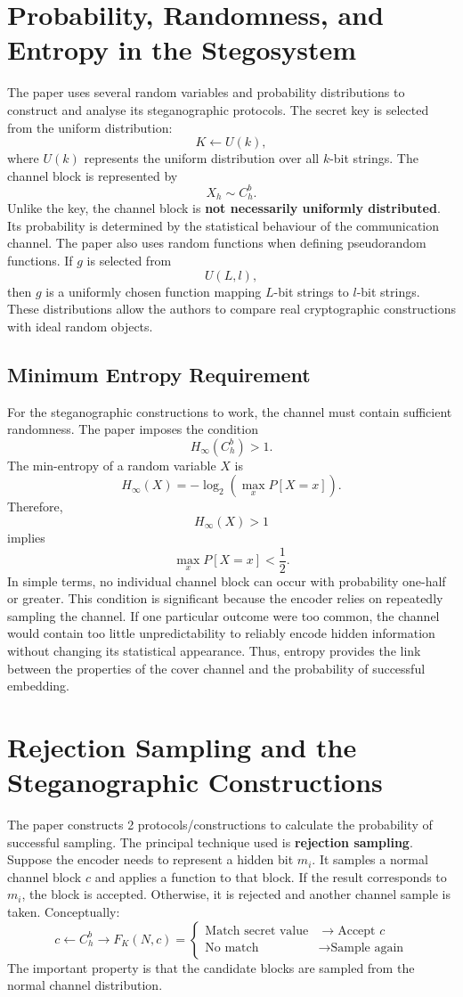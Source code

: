 \documentclass[14pt]{article}
\begin{document}
\section{Probability, Randomness, and Entropy in the Stegosystem}
The paper uses several random variables and probability distributions to construct and analyse its steganographic protocols.
The secret key is selected from the uniform distribution:
\[
K\leftarrow U(k),
\]
where \(U(k)\) represents the uniform distribution over all \(k\)-bit strings.
The channel block is represented by
\[
X_h\sim C_h^b.
\]
Unlike the key, the channel block is \textbf{not necessarily uniformly distributed}. Its probability is determined by the statistical behaviour of the communication channel.
The paper also uses random functions when defining pseudorandom functions. If \(g\) is selected from
\[
U(L,l),
\]
then \(g\) is a uniformly chosen function mapping \(L\)-bit strings to \(l\)-bit strings.
These distributions allow the authors to compare real cryptographic constructions with ideal random objects.
\subsection{Minimum Entropy Requirement}
For the steganographic constructions to work, the channel must contain sufficient randomness. The paper imposes the condition
\[
H_\infty(C_h^b)>1.
\]
The min-entropy of a random variable \(X\) is
\[
H_\infty(X)
=
-\log_2\left(\max_xP[X=x]\right).
\]
Therefore,
\[
H_\infty(X)>1
\]
implies
\[
\max_xP[X=x]<\frac12.
\]
In simple terms, no individual channel block can occur with probability one-half or greater.
This condition is significant because the encoder relies on repeatedly sampling the channel. If one particular outcome were too common, the channel would contain too little unpredictability to reliably encode hidden information without changing its statistical appearance.
Thus, entropy provides the link between the properties of the cover channel and the probability of successful embedding.

\section{Rejection Sampling and the Steganographic Constructions}
The paper constructs 2 protocols/constructions to calculate the probability of successful sampling. 
The principal technique used is \textbf{rejection sampling}.
Suppose the encoder needs to represent a hidden bit \(m_i\). It samples a normal channel block \(c\) and applies a function to that block. If the result corresponds to \(m_i\), the block is accepted. Otherwise, it is rejected and another channel sample is taken.
Conceptually:
\[
c\leftarrow C_h^b \rightarrow F_K(N,c) = 
\begin{cases}
\text{Match secret value} &\rightarrow \text{Accept }c\\
\text{No match} &\rightarrow \text{Sample again}
\end{cases}
\]
The important property is that the candidate blocks are sampled from the normal channel distribution.
 
\end{document}
